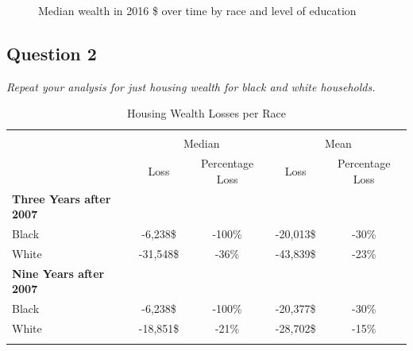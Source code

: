 \documentclass[]{scrartcl}
\begin{document}
\begin{figure}[h]
\begin{subfigure}{.49\textwidth}
	\end{subfigure}
	\caption{Median wealth in 2016 \$ over time by race and level of education}\label{fig:gen_trends}
\end{figure}

\subsection*{Question 2}
\textit{Repeat your analysis for just housing wealth for black and white households.} \\
\begin{table}[h]
	\centering
	\caption{Housing Wealth Losses per Race}
	\label{key}
	\begin{tabular}{@{\extracolsep{5pt}} lcc|cc}
		\\[-1.8ex]\hline
		\hline \\[-1.8ex]
		& \multicolumn{2}{c}{Median} & \multicolumn{2}{c}{Mean} \\ \hline
		&	Loss	&	Percentage Loss &	Loss	&	Percentage Loss \\ \hline
		\bfseries{Three Years after 2007} & & \\
		Black	&	-6,238\$	& -100\% & -20,013\$ & -30\% \\
		White	&	-31,548\$& -36\% & -43,839\$ & -23\% \\
		\bfseries{Nine Years after 2007} & & \\
		Black	&	-6,238\$ & -100\% & -20,377\$ & -30\% \\
		White	&	-18,851\$ & -21\% & -28,702\$ & -15\% \\
		\hline \\[-1.8ex]
	\end{tabular}
\end{table}
\end{document}
